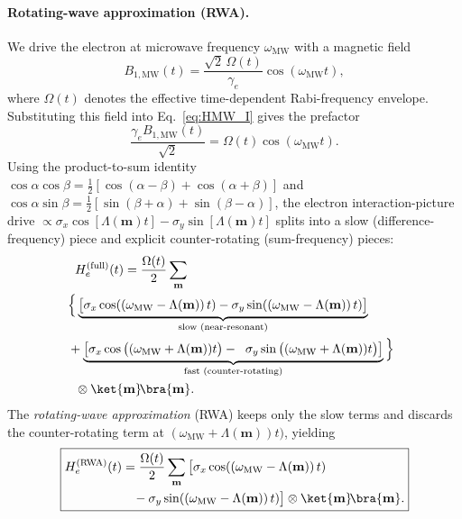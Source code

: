 \paragraph{Rotating-wave approximation (RWA).}
We drive the electron at microwave frequency $\omega_{\mathrm{MW}}$ with a magnetic field
\begin{equation}
B_{1,\mathrm{MW}}(t)
=
\frac{\sqrt2\,\Omega(t)}{\gamma_e}
\cos(\omega_{\mathrm{MW}} t),
\end{equation}
where $\Omega(t)$ denotes the effective time-dependent Rabi-frequency envelope. 
Substituting this field into Eq.~\eqref{eq:HMW_I} gives the prefactor
\[
\frac{\gamma_e B_{1,\mathrm{MW}}(t)}{\sqrt2}
=
\Omega(t)\cos(\omega_{\mathrm{MW}} t).
\]
Using the product-to-sum identity $\cos\alpha\cos\beta=\tfrac12[\cos(\alpha-\beta)+\cos(\alpha+\beta)]$
and $\cos\alpha\sin\beta=\tfrac12[\sin(\beta+\alpha)+\sin(\beta-\alpha)]$,
the electron interaction-picture drive
\(
\propto \sigma_x\cos[\Lambda(\mathbf m)t]-\sigma_y\sin[\Lambda(\mathbf m)t]
\)
splits into a slow (difference-frequency) piece and explicit counter-rotating (sum-frequency) pieces:
\begin{align}
&\notag\hspace{-0.0cm}H_{e}^{(\mathrm{full})}(t)= \frac{\Omega(t)}{2}\sum_{\mathbf m}\\
&\hspace{-0.2cm}
\Big\{\underbrace{\big[\sigma_x\cos((\omega_{\mathrm{MW}}-\Lambda(\mathbf m))\,t)-\sigma_y\sin((\omega_{\mathrm{MW}}-\Lambda(\mathbf m))\,t)\big]}_{\text{slow (near-resonant)}}\nonumber\\
&\hspace{-0.2cm}
+\notag \underbrace{\big[\sigma_x\cos\big((\omega_{\mathrm{MW}}+\Lambda(\mathbf m))t\big)- 
\hspace{0.2cm} \sigma_y\sin\big((\omega_{\mathrm{MW}}+\Lambda(\mathbf m))t\big)\big]}_{\text{fast (counter-rotating)}}\Big\}\\
&\otimes \ket{\mathbf m}\!\bra{\mathbf m}.
\label{eq:He_full_split}
\end{align}
The \emph{rotating-wave approximation} (RWA) keeps only the slow terms and discards the counter-rotating term at  $(\omega_{\mathrm{MW}}+\Lambda(\mathbf m))t\big)$, yielding
\begin{equation}
\boxed{
\begin{aligned}
&H_{e}^{(\mathrm{RWA})}(t)
= \frac{\Omega(t)}{2} \sum_{\mathbf m}
\big[\sigma_x\cos((\omega_{\mathrm{MW}}-\Lambda(\mathbf m))\,t)\\ & \hspace{1.9cm}-\sigma_y\sin((\omega_{\mathrm{MW}}-\Lambda(\mathbf m))\,t)\big]
\otimes \ket{\mathbf m}\!\bra{\mathbf m}.
\end{aligned}
}
\label{eq:HeRWA_time_nophase_Lambda_m}
\end{equation}
